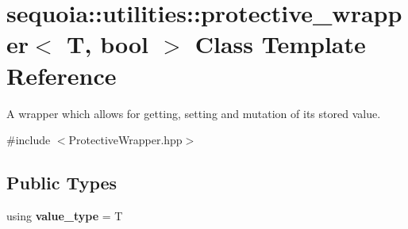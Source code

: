 \hypertarget{classsequoia_1_1utilities_1_1protective__wrapper}{}\section{sequoia\+::utilities\+::protective\+\_\+wrapper$<$ T, bool $>$ Class Template Reference}
\label{classsequoia_1_1utilities_1_1protective__wrapper}


A wrapper which allows for getting, setting and mutation of its stored value.  




{\ttfamily \#include $<$Protective\+Wrapper.\+hpp$>$}

\subsection*{Public Types}
\begin{DoxyCompactItemize}
\item 
\mbox{\label{classsequoia_1_1utilities_1_1protective__wrapper_a497db7be596dbe8cb452e33d9b9ecc80}} 
using {\bfseries value\+\_\+type} = T
\end{DoxyCompactItemize}
